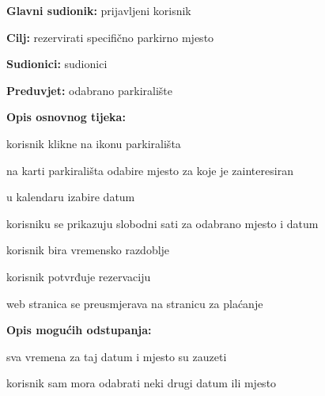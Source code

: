 					\noindent {}
					\begin{packed_item}
						
						\item \textbf{Glavni sudionik: }prijavljeni korisnik
						\item  \textbf{Cilj:} rezervirati specifično parkirno mjesto
						\item  \textbf{Sudionici:} sudionici
						\item  \textbf{Preduvjet:} odabrano parkiralište
						\item  \textbf{Opis osnovnog tijeka:}
						
						\item[] \begin{packed_enum}
							
							\item korisnik klikne na ikonu parkirališta
							\item na karti parkirališta odabire mjesto za koje je zainteresiran
							\item u kalendaru izabire datum
							\item korisniku se prikazuju slobodni sati za odabrano mjesto i datum
							\item korisnik bira vremensko razdoblje
							\item korisnik potvrđuje rezervaciju
							\item web stranica se preusmjerava na stranicu za plaćanje
						\end{packed_enum}
						
						\item  \textbf{Opis mogućih odstupanja:}
						
						\item[] \begin{packed_item}
							
							\item[4.a] sva vremena za taj datum i mjesto su zauzeti
							\item[] \begin{packed_enum}
								
								\item korisnik sam mora odabrati neki drugi datum ili mjesto
								
							\end{packed_enum}
							
						\end{packed_item}
					\end{packed_item}
					
